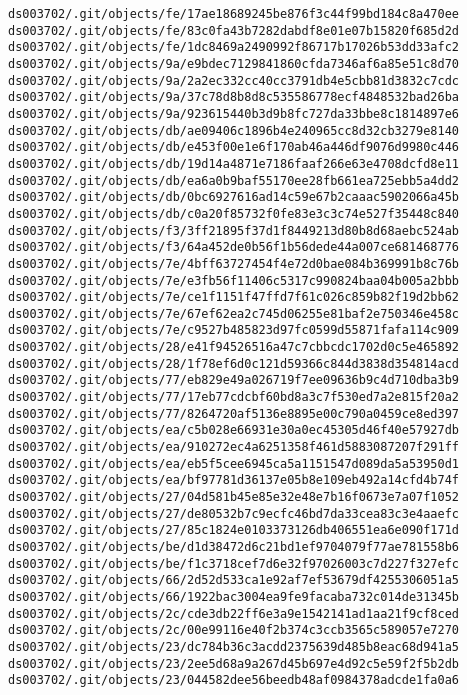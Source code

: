 \documentclass[11pt]{article}
\begin{document}
\begin{Verbatim}[commandchars=\\\{\}]
ds003702/.git/objects/fe/17ae18689245be876f3c44f99bd184c8a470ee
ds003702/.git/objects/fe/83c0fa43b7282dabdf8e01e07b15820f685d2d
ds003702/.git/objects/fe/1dc8469a2490992f86717b17026b53dd33afc2
ds003702/.git/objects/9a/e9bdec7129841860cfda7346af6a85e51c8d70
ds003702/.git/objects/9a/2a2ec332cc40cc3791db4e5cbb81d3832c7cdc
ds003702/.git/objects/9a/37c78d8b8d8c535586778ecf4848532bad26ba
ds003702/.git/objects/9a/923615440b3d9b8fc727da33bbe8c1814897e6
ds003702/.git/objects/db/ae09406c1896b4e240965cc8d32cb3279e8140
ds003702/.git/objects/db/e453f00e1e6f170ab46a446df9076d9980c446
ds003702/.git/objects/db/19d14a4871e7186faaf266e63e4708dcfd8e11
ds003702/.git/objects/db/ea6a0b9baf55170ee28fb661ea725ebb5a4dd2
ds003702/.git/objects/db/0bc6927616ad14c59e67b2caaac5902066a45b
ds003702/.git/objects/db/c0a20f85732f0fe83e3c3c74e527f35448c840
ds003702/.git/objects/f3/3ff21895f37d1f8449213d80b8d68aebc524ab
ds003702/.git/objects/f3/64a452de0b56f1b56dede44a007ce681468776
ds003702/.git/objects/7e/4bff63727454f4e72d0bae084b369991b8c76b
ds003702/.git/objects/7e/e3fb56f11406c5317c990824baa04b005a2bbb
ds003702/.git/objects/7e/ce1f1151f47ffd7f61c026c859b82f19d2bb62
ds003702/.git/objects/7e/67ef62ea2c745d06255e81baf2e750346e458c
ds003702/.git/objects/7e/c9527b485823d97fc0599d55871fafa114c909
ds003702/.git/objects/28/e41f94526516a47c7cbbcdc1702d0c5e465892
ds003702/.git/objects/28/1f78ef6d0c121d59366c844d3838d354814acd
ds003702/.git/objects/77/eb829e49a026719f7ee09636b9c4d710dba3b9
ds003702/.git/objects/77/17eb77cdcbf60bd8a3c7f530ed7a2e815f20a2
ds003702/.git/objects/77/8264720af5136e8895e00c790a0459ce8ed397
ds003702/.git/objects/ea/c5b028e66931e30a0ec45305d46f40e57927db
ds003702/.git/objects/ea/910272ec4a6251358f461d5883087207f291ff
ds003702/.git/objects/ea/eb5f5cee6945ca5a1151547d089da5a53950d1
ds003702/.git/objects/ea/bf97781d36137e05b8e109eb492a14cfd4b74f
ds003702/.git/objects/27/04d581b45e85e32e48e7b16f0673e7a07f1052
ds003702/.git/objects/27/de80532b7c9ecfc46bd7da33cea83c3e4aaefc
ds003702/.git/objects/27/85c1824e0103373126db406551ea6e090f171d
ds003702/.git/objects/be/d1d38472d6c21bd1ef9704079f77ae781558b6
ds003702/.git/objects/be/f1c3718cef7d6e32f97026003c7d227f327efc
ds003702/.git/objects/66/2d52d533ca1e92af7ef53679df4255306051a5
ds003702/.git/objects/66/1922bac3004ea9fe9facaba732c014de31345b
ds003702/.git/objects/2c/cde3db22ff6e3a9e1542141ad1aa21f9cf8ced
ds003702/.git/objects/2c/00e99116e40f2b374c3ccb3565c589057e7270
ds003702/.git/objects/23/dc784b36c3acdd2375639d485b8eac68d941a5
ds003702/.git/objects/23/2ee5d68a9a267d45b697e4d92c5e59f2f5b2db
ds003702/.git/objects/23/044582dee56beedb48af0984378adcde1fa0a6

\end{Verbatim}
\end{document}
